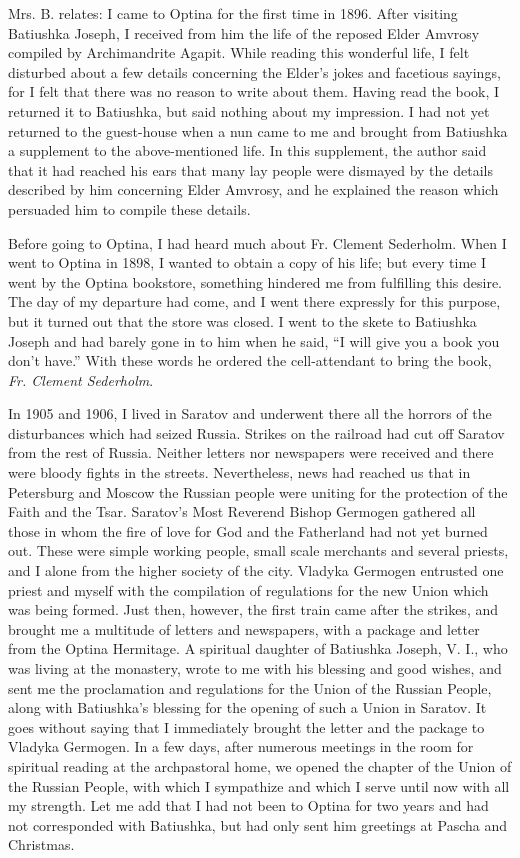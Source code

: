 \begin{longquote}{Mrs. B. relates:}
I came to Optina for the first time in 1896. After visiting Batiushka Joseph, I received from him the life of the reposed Elder Amvrosy compiled by Archimandrite Agapit. While reading this wonderful life, I felt disturbed about a few details concerning the Elder's jokes and facetious sayings, for I felt that there was no reason to write about them. Having read the book, I returned it to Batiushka, but said nothing about my impression. I had not yet returned to the guest-house when a nun came to me and brought from Batiushka a supplement to the above-mentioned life. In this supplement, the author said that it had reached his ears that many lay people were dismayed by the details described by him concerning Elder Amvrosy, and he explained the reason which persuaded him to compile these details.

Before going to Optina, I had heard much about Fr. Clement Sederholm. When I went to Optina in 1898, I wanted to obtain a copy of his life; but every time I went by the Optina bookstore, something hindered me from fulfilling this desire. The day of my departure had come, and I went there expressly for this purpose, but it turned out that the store was closed. I went to the skete to Batiushka Joseph and had barely gone in to him when he said, ``I will give you a book you don't have.'' With these words he ordered the cell-attendant to bring the book, \textit{Fr. Clement Sederholm}.

In 1905 and 1906, I lived in Saratov and underwent there all the horrors of the disturbances which had seized Russia. Strikes on the railroad had cut off Saratov from the rest of Russia. Neither letters nor newspapers were received and there were bloody fights in the streets. Nevertheless, news had reached us that in Petersburg and Moscow the Russian people were uniting for the protection of the Faith and the Tsar. Saratov's Most Reverend Bishop Germogen gathered all those in whom the fire of love for God and the Fatherland had not yet burned out. These were simple working people, small scale merchants and several priests, and I alone from the higher society of the city. Vladyka Germogen entrusted one priest and myself with the compilation of regulations for the new Union which was being formed. Just then, however, the first train came after the strikes, and brought me a multitude of letters and newspapers, with a package and letter from the Optina Hermitage. A spiritual daughter of Batiushka Joseph, V. I., who was living at the monastery, wrote to me with his blessing and good wishes, and sent me the proclamation and regulations for the Union of the Russian People, along with Batiushka's blessing for the opening of such a Union in Saratov. It goes without saying that I immediately brought the letter and the package to Vladyka Germogen. In a few days, after numerous meetings in the room for spiritual reading at the archpastoral home, we opened the chapter of the Union of the Russian People, with which I sympathize and which I serve until now with all my strength. Let me add that I had not been to Optina for two years and had not corresponded with Batiushka, but had only sent him greetings at Pascha and Christmas.


\end{longquote}
